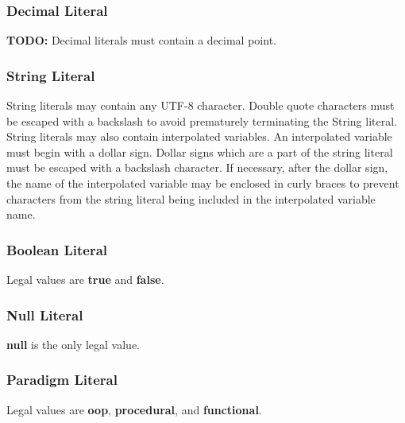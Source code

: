 \documentclass[hidelinks]{article}
\begin{document}
\subsubsection{Decimal Literal}
\textbf{TODO:} Decimal literals must contain a decimal point.

\subsubsection{String Literal}
String literals may contain any UTF-8 character. Double quote characters must be escaped with a backslash to avoid prematurely terminating the String literal. String literals may also contain interpolated variables. An interpolated variable must begin with a dollar sign. Dollar signs which are a part of the string literal must be escaped with a backslash character. If necessary, after the dollar sign, the name of the interpolated variable may be enclosed in curly braces to prevent characters from the string literal being included in the interpolated variable name.

\subsubsection{Boolean Literal}
Legal values are \textbf{true} and \textbf{false}.

\subsubsection{Null Literal}
\textbf{null} is the only legal value.

\subsubsection{Paradigm Literal}
Legal values are \textbf{oop}, \textbf{procedural}, and \textbf{functional}.
\end{document}

